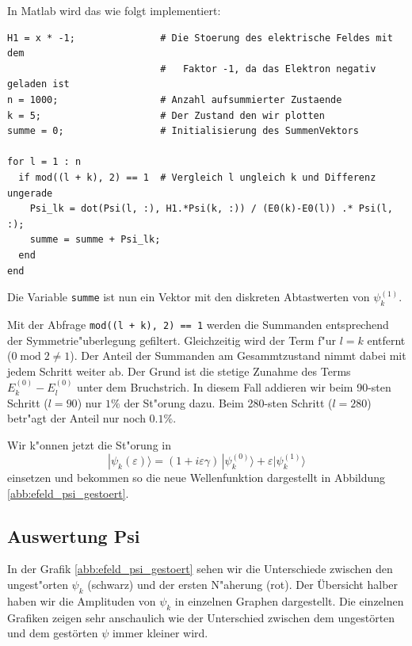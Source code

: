 \begin{refsection}
In Matlab wird das wie folgt implementiert:
\begin{lstlisting}[style=Matlab]
H1 = x * -1;               # Die Stoerung des elektrische Feldes mit dem
                           #   Faktor -1, da das Elektron negativ geladen ist
n = 1000;                  # Anzahl aufsummierter Zustaende
k = 5;                     # Der Zustand den wir plotten
summe = 0;                 # Initialisierung des SummenVektors

for l = 1 : n
  if mod((l + k), 2) == 1  # Vergleich l ungleich k und Differenz ungerade
    Psi_lk = dot(Psi(l, :), H1.*Psi(k, :)) / (E0(k)-E0(l)) .* Psi(l, :);
    summe = summe + Psi_lk;
  end
end
\end{lstlisting}
Die Variable \verb|summe| ist nun ein Vektor mit den diskreten Abtastwerten von $\psi_k^{(1)}$.

Mit der Abfrage \verb|mod((l + k), 2) == 1| werden die Summanden 
entsprechend der Symmetrie"uberlegung gefiltert.
Gleichzeitig wird der Term f"ur $l=k$ entfernt ($0 \operatorname{mod} 2 \ne 1$).
Der Anteil der Summanden am Gesammtzustand nimmt dabei mit jedem Schritt weiter ab.
Der Grund ist die stetige Zunahme des Terms $E^{(0)}_k-E^{(0)}_l$ unter dem Bruchstrich.
In diesem Fall addieren wir beim 90-sten Schritt ($l=90$) nur $1\%$ der St"orung dazu.
Beim 280-sten Schritt ($l=280$) betr"agt der Anteil nur noch $0.1\%$.

Wir k"onnen jetzt die St"orung in 
\begin{equation}
|\psi_k(\varepsilon)\rangle
=
(1+i\varepsilon \gamma)
\,|\psi_k^{(0)}\rangle
+
\varepsilon|\psi_k^{(1)}\rangle
\end{equation}
einsetzen und bekommen so die neue Wellenfunktion dargestellt in Abbildung \ref{abb:efeld_psi_gestoert}.




\subsection{Auswertung Psi}

In der Grafik \ref{abb:efeld_psi_gestoert} sehen wir die Unterschiede zwischen den ungest"orten 
$\psi_k$ (schwarz) und der ersten N"aherung (rot).
Der \"Ubersicht halber haben wir die Amplituden von $\psi_k$ in einzelnen Graphen dargestellt.
Die einzelnen Grafiken zeigen sehr anschaulich wie der Unterschied zwischen dem ungest\"orten und dem gest\"orten $\psi$
immer kleiner wird.


\end{refsection}
